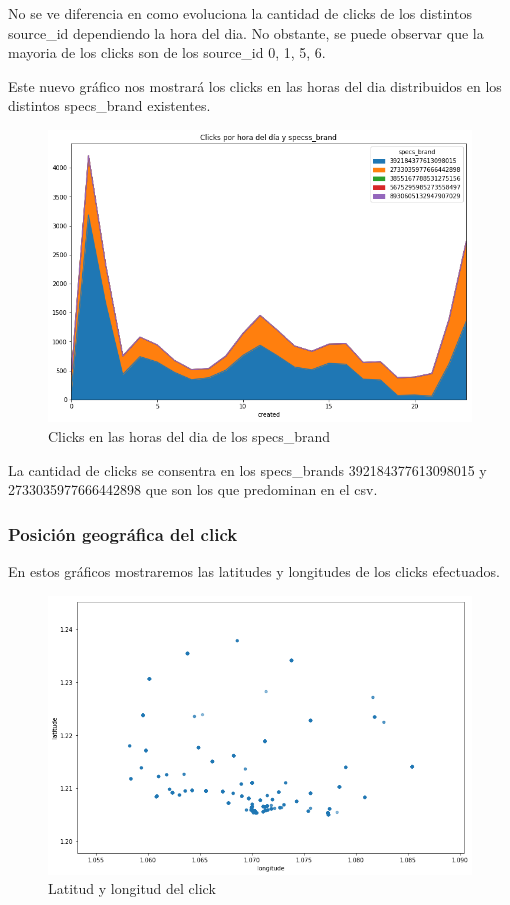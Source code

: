 \documentclass[a4paper, 12pt]{article}
\newcommand\tab[1][1cm]{\hspace*{#1}}
\begin{document}
	
		\tab No se ve diferencia en como evoluciona la cantidad de clicks de los distintos source\_id dependiendo la hora del dia. No obstante, se puede observar que la mayoria de los clicks son de los source\_id 0, 1, 5, 6.

		\clearpage
		\tab Este nuevo gráfico nos mostrará los clicks en las horas del dia distribuidos en los distintos specs\_brand existentes.

		\FloatBarrier
		\begin{figure}[h]
			\centering
			\includegraphics[width=\textwidth]{images/clicks/clicks_specs_brand_hours.png}
			\caption{Clicks en las horas del dia de los specs\_brand}
		\end{figure}
		\FloatBarrier

		\tab La cantidad de clicks se consentra en los specs\_brands 392184377613098015 y 2733035977666442898 que son los que predominan en el csv.
	
	\clearpage
	\subsubsection{Posición geográfica del click}
		
		\tab En estos gráficos mostraremos las latitudes y longitudes de los clicks efectuados.

		\FloatBarrier
		\begin{figure}[h]
			\centering
			\includegraphics[scale=0.48]{images/clicks/clicks_lat_long_scatter.png}
			\caption{Latitud y longitud del click}
		\end{figure}
		\FloatBarrier
\end{document}
